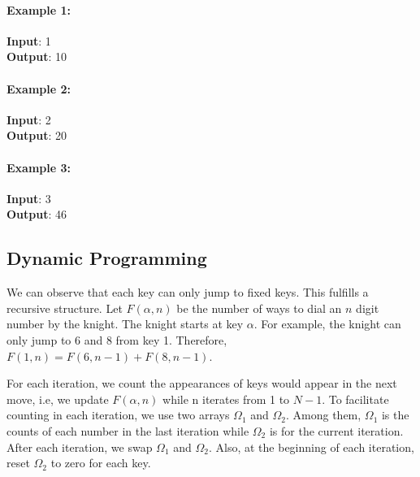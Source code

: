 \paragraph{Example 1:}
\begin{flushleft}
\textbf{Input}: 1
\\
\textbf{Output}: 10
\end{flushleft}
\paragraph{Example 2:}
\begin{flushleft}
 \textbf{Input}: 2
 \\
 \textbf{Output}: 20
 \end{flushleft} 
\paragraph{Example 3:}
\begin{flushleft}
\textbf{Input}: 3
\\
\textbf{Output}: 46
\end{flushleft}
\subsection{Dynamic Programming}
\begin{figure}[H]
\end{figure}
We can observe that each key can only jump to fixed keys. This fulfills a recursive structure. Let $F(\alpha, n)$ be the number of ways to dial an $n$ digit number by the knight. The knight starts at key $\alpha$. For example, the knight can only jump to 6 and 8 from key 1. Therefore, $F(1, n) = F(6, n-1) + F(8, n-1)$.
\par
For each iteration, we count the appearances of keys would appear in the next move, i.e, we update $F(\alpha, n)$ while n iterates from 1 to $N-1$. To facilitate counting in each iteration, we use two arrays $\Omega_1$ and $\Omega_2$. Among them, $\Omega_1$ is the counts of each number in the last iteration while $\Omega_2$ is for the current iteration. After each iteration, we swap $\Omega_1$ and $\Omega_2$. Also, at the beginning of each iteration, reset $\Omega_2$ to zero for each key.
